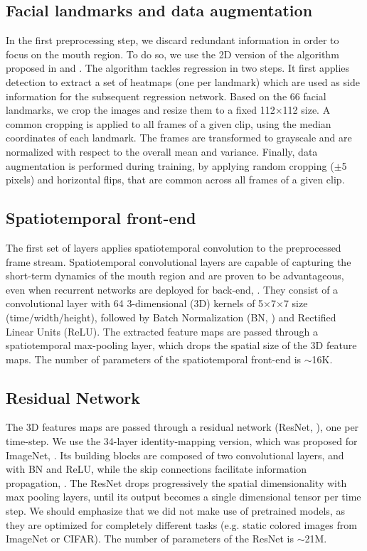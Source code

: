 \documentclass[a4paper]{article}
\begin{document}
\subsection{Facial landmarks and data augmentation}
In the first preprocessing step, we discard redundant information in order to focus on the mouth region. To do so, we use the 2D version of the algorithm proposed in \cite{bulat2016convolutional} and \cite{bulat2016two}. The algorithm tackles regression in two steps. It first applies detection to extract a set of heatmaps (one per landmark) which are used as side information for the subsequent regression network. Based on the 66 facial landmarks, we crop the images and resize them to a fixed 112$\times$112 size. A common cropping is applied to all frames of a given clip, using the median coordinates of each landmark. 
The frames are transformed to grayscale and are normalized with respect to the overall mean and variance. Finally, data augmentation is performed during training, by applying random cropping ($\pm$5 pixels) and horizontal flips, that are common across all frames of a given clip. 
\subsection{Spatiotemporal front-end}
The first set of layers applies spatiotemporal convolution to the preprocessed frame stream. Spatiotemporal convolutional layers are capable of capturing the short-term dynamics of the mouth region and are proven to be advantageous, even when recurrent networks are deployed for back-end, \cite{assael2016lipnet}. They consist of a convolutional layer with 64 3-dimensional (3D) kernels of 5$\times$7$\times$7 size (time/width/height), followed by Batch Normalization (BN, \cite{ioffe2015batch}) and Rectified Linear Units (ReLU). The extracted feature maps are passed through a spatiotemporal max-pooling layer, which drops the spatial size of the 3D feature maps. The number of parameters of the spatiotemporal front-end is $\sim$16K.  

\subsection{Residual Network}
The 3D features maps are passed through a residual network (ResNet, \cite{he2016deep}), one per time-step. We use the 34-layer identity-mapping version, which was proposed for ImageNet, \cite{he2016identity}. Its building blocks are composed of two convolutional layers, and with BN and ReLU, while the skip connections facilitate information propagation, \cite{he2016identity}. The ResNet drops progressively the spatial dimensionality with max pooling layers, until its output becomes a single dimensional tensor per time step. We should emphasize that we did not make use of pretrained models, as they are optimized for completely different tasks (e.g. static colored images from ImageNet or CIFAR). The number of parameters of the ResNet is $\sim$21M. 
\end{document}
